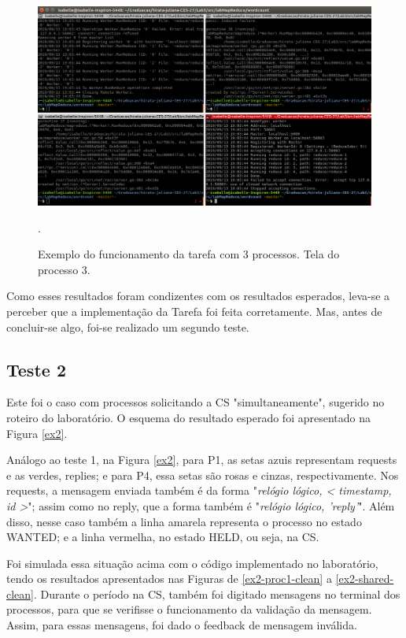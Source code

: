 \documentclass[conference]{IEEEtran}
\begin{document}
\begin{figure}[H]
\centering
\centerline{\includegraphics[scale=0.5]{imagens/tarefa_2_4_1/tarefa_2_4_1.png}}
\caption{Exemplo do funcionamento da tarefa com 3 processos. Tela do processo 3.}.
\label{ex1-proc3}
\end{figure}


	Como esses resultados foram condizentes com os resultados esperados, leva-se a perceber que a implementação da Tarefa foi feita corretamente. Mas, antes de concluir-se algo, foi-se realizado um segundo teste.

\subsection{Teste 2}

	Este foi o caso com processos solicitando a CS "simultaneamente", sugerido no roteiro do laboratório. O esquema do resultado esperado foi apresentado na Figura \ref{ex2}.
	
	Análogo ao teste 1, na Figura \ref{ex2}, para P1, as setas azuis representam requests e as verdes, replies; e para P4, essa setas são rosas e cinzas, respectivamente. Nos requests, a mensagem enviada também é da forma "\textit{relógio lógico, < timestamp, id >}"; assim como no reply, que a forma também é "\textit{relógio lógico, 'reply'}". Além disso, nesse caso também a linha amarela representa o processo no estado WANTED; e a linha vermelha, no estado HELD, ou seja, na CS.


	Foi simulada essa situação acima com o código implementado no laboratório, tendo os resultados apresentados nas Figuras de \ref{ex2-proc1-clean} a \ref{ex2-shared-clean}. Durante o período na CS, também foi digitado mensagens no terminal dos processos, para que se verifisse o funcionamento da validação da mensagem. Assim, para essas mensagens, foi dado o feedback de mensagem inválida.
\end{document}
